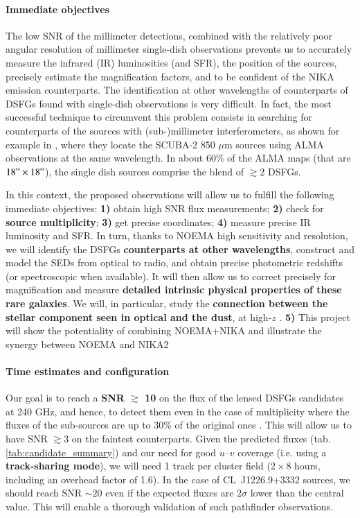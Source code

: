 \documentclass[11pt,a4paper,twoside,graphicx,color]{article}
\begin{document}
\paragraph{\large Immediate objectives}
The low SNR of the millimeter detections, combined with the relatively poor angular resolution of millimeter single-dish observations prevents us to accurately measure the infrared (IR) luminosities (and SFR), the position of the sources, precisely estimate the magnification factors, and to be confident of the NIKA emission counterparts. The identification at other wavelengths of counterparts of DSFGs found with single-dish observations is very difficult. In fact, the most successful technique to circumvent this problem consists in searching for counterparts of the sources with (sub-)millimeter interferometers, as shown for example in \cite{Simpson2015}, where they locate the SCUBA-2 850 $\mu$m sources using ALMA observations at the same wavelength. In about 60\% of the ALMA maps (that are $18" \times 18"$), the single dish sources comprise the blend of $\gtrsim 2$ DSFGs. 

In this context, the proposed observations will allow us to fulfill the following immediate objectives: {\bf 1)} obtain high SNR flux measurements; {\bf 2)} check for {\bf source multiplicity}; {\bf 3)} get precise coordinates; {\bf 4)} measure precise IR luminosity and SFR. In turn, thanks to NOEMA high sensitivity and resolution, we will identify the DSFGs {\bf counterparts at other wavelengths}, construct and model the SEDs from optical to radio, and obtain precise photometric redshifts (or spectroscopic when available). It will then allow us to correct precisely for magnification and measure {\bf detailed intrinsic physical properties of these rare galaxies}. We will, in particular, study the {\bf connection between the stellar component seen in optical and the dust}, at high-$z$ \citep[see, e.g.,][]{Bouwens2016}. {\bf 5)} This project will show the potentiality of combining NOEMA+NIKA and illustrate the synergy between NOEMA and NIKA2

\paragraph{\large Time estimates and configuration}
Our goal is to reach a {\bf SNR $\gtrsim$ 10} on the flux of the lensed DSFGs candidates at 240 GHz, and hence, to detect them even in the case of multiplicity where the fluxes of the sub-sources are up to 30\% of the original ones \citep[in 40\% of the targets,][]{Simpson2015}. This will allow us to have SNR $\gtrsim 3$ on the faintest counterparts. Given the predicted fluxes (tab. \ref{tab:candidate_summary}) and our need for good $u$--$v$ coverage (i.e. using a {\bf track-sharing mode}), we will need 1 track per cluster field ($2 \times 8$ hours, including an overhead factor of 1.6). In the case of \mbox{CL~J1226.9+3332} sources, we should reach SNR $\sim 20$ even if the expected fluxes are $2 \sigma$ lower than the central value. This will enable a thorough validation of such pathfinder observations. 
\end{document}
